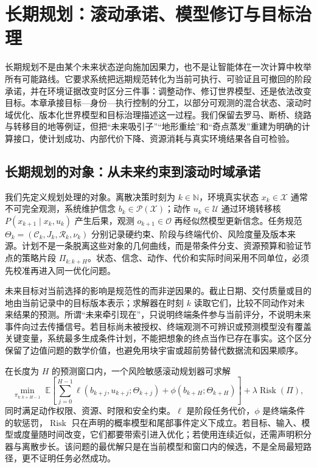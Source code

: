 \chapter{长期规划：滚动承诺、模型修订与目标治理}
\label{chp:long_term_planning_and_goal_revision}
长期规划不是由某个未来状态逆向施加因果力，也不是让智能体在一次计算中枚举所有可能路线。它要求系统把远期规范转化为当前可执行、可验证且可撤回的阶段承诺，并在环境证据改变时区分三件事：调整动作、修订世界模型、还是依法改变目标。本章承接目标—身份—执行控制的分工，以部分可观测的混合状态、滚动时域优化、版本化世界模型和目标治理描述这一过程。我们保留去罗马、断桥、绕路与转移目的地等例证，但把“未来吸引子”“地形重绘”和“奇点蒸发”重建为明确的计算接口，使计划成功、内部代价下降、资源消耗与真实环境结果各自可检验。

\section{长期规划的对象：从未来约束到滚动时域承诺}
\label{sec:physics_of_planning}
我们先定义规划处理的对象。离散决策时刻为 $k\in\mathbb N$，环境真实状态 $x_k\in\mathcal X$ 通常不可完全观测，系统维护信念 $b_k\in\mathcal P(\mathcal X)$；动作 $u_k\in\mathcal U$ 通过环境转移核 $P(x_{k+1}\mid x_k,u_k)$ 产生后果，观测 $o_{k+1}\in\mathcal O$ 再经似然模型更新信念。任务规范 $\Theta_k=(\mathcal C_k,J_k,\mathcal R_k,\nu_k)$ 分别记录硬约束、阶段与终端代价、风险度量及版本来源。计划不是一条脱离这些对象的几何曲线，而是带条件分支、资源预算和验证节点的策略片段 $\Pi_{k:k+H}$。状态、信念、动作、代价和实际时间采用不同单位，必须先校准再进入同一优化问题。

未来目标对当前选择的影响是规范性的而非逆因果的。截止日期、交付质量或目的地由当前记录中的目标版本表示；求解器在时刻 $k$ 读取它们，比较不同动作对未来结果的预测。所谓“未来牵引现在”，只说明终端条件参与当前评分，不说明未来事件向过去传播信号。若目标尚未被授权、终端观测不可辨识或预测模型没有覆盖关键变量，系统最多生成条件计划，不能把想象的终点当作已存在事实。这个区分保留了边值问题的数学价值，也避免用块宇宙或超前势替代数据流和因果顺序。

在长度为 $H$ 的预测窗口内，一个风险敏感滚动规划器可求解
\[
\min_{\pi_{k:k+H-1}}\;\mathbb E\!\left[\sum_{j=0}^{H-1}
\ell(b_{k+j},u_{k+j};\Theta_{k+j})+\phi(b_{k+H};\Theta_{k+H})\right]
+\lambda\operatorname{Risk}(\Pi),
\]
同时满足动作权限、资源、时限和安全约束。$\ell$ 是阶段任务代价，$\phi$ 是终端条件的软惩罚，$\operatorname{Risk}$ 只在声明的概率模型和尾部事件定义下成立。若目标、输入、模型或度量随时间改变，它们都要带索引进入优化；若使用连续近似，还需声明积分器与离散步长。该问题的最优解只是在当前模型和窗口内的候选，不是全局最短路径，更不证明任务必然成功。

